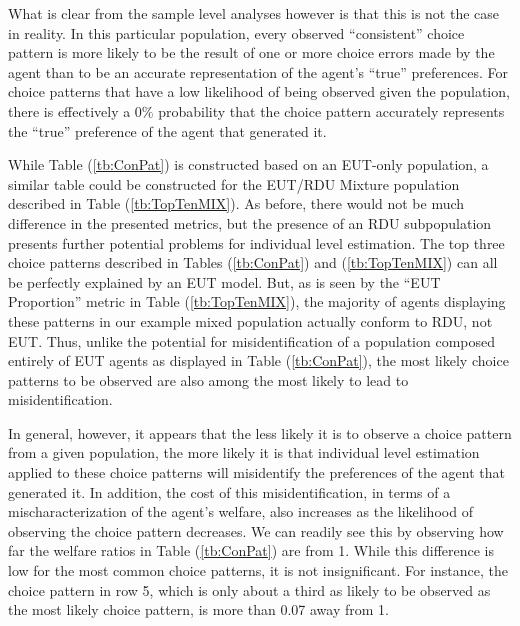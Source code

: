 \documentclass[../main.tex]{subfiles}
\begin{document}
\addtocounter{footnote}{-1}

What is clear from the sample level analyses however is that this is not the case in reality.
In this particular population, every observed \enquote{consistent} choice pattern is more likely to be the result of one or more choice errors made by the agent than to be an accurate representation of the agent's \enquote{true} preferences.
For choice patterns that have a low likelihood of being observed given the population, there is effectively a $0\%$ probability that the choice pattern accurately represents the \enquote{true} preference of the agent that generated it.

While Table (\ref{tb:ConPat}) is constructed based on an EUT-only population, a similar table could be constructed for the EUT/RDU Mixture population described in Table (\ref{tb:TopTenMIX}).
As before, there would not be much difference in the presented metrics, but the presence of an RDU subpopulation presents further potential problems for individual level estimation.
The top three choice patterns described in Tables (\ref{tb:ConPat}) and (\ref{tb:TopTenMIX}) can all be perfectly explained by an EUT model. 
But, as is seen by the \enquote{EUT Proportion} metric in Table (\ref{tb:TopTenMIX}), the majority of agents displaying these patterns in our example mixed population actually conform to RDU, not EUT.
Thus, unlike the potential for misidentification of a population composed entirely of EUT agents as displayed in Table (\ref{tb:ConPat}), the most likely choice patterns to be observed are also among the most likely to lead to misidentification.

In general, however, it appears that the less likely it is to observe a choice pattern from a given population, the more likely it is that individual level estimation applied to these choice patterns will misidentify the preferences of the agent that generated it.
In addition, the cost of this misidentification, in terms of a mischaracterization of the agent's welfare, also increases as the likelihood of observing the choice pattern decreases.
We can readily see this by observing how far the welfare ratios in Table (\ref{tb:ConPat}) are from 1.
While this difference is low for the most common choice patterns, it is not insignificant.
For instance, the choice pattern in row 5, which is only about a third as likely to be observed as the most likely choice pattern, is more than 0.07 away from 1.
\end{document}

